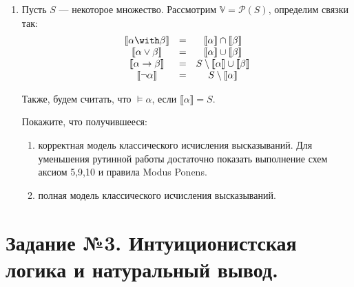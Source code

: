 \documentclass[10pt,a4paper,oneside]{article}
\begin{document}
\begin{enumerate}
\item Пусть $S$ --- некоторое множество. Рассмотрим $\mathbb{V} = \mathcal{P}(S)$, 
определим связки так:
$$\begin{array}{ccc}
  \llbracket\alpha \with \beta\rrbracket & = & \llbracket\alpha\rrbracket \cap \llbracket\beta\rrbracket \\
  \llbracket\alpha \vee \beta\rrbracket & = & \llbracket\alpha\rrbracket \cup \llbracket\beta\rrbracket \\
  \llbracket\alpha \rightarrow \beta\rrbracket & = & S\setminus\llbracket\alpha\rrbracket \cup \llbracket\beta\rrbracket \\
  \llbracket\neg\alpha\rrbracket & = & S\setminus\llbracket\alpha\rrbracket  \\
\end{array}$$

Также, будем считать, что $\models \alpha$, если $\llbracket\alpha\rrbracket = S$.

Покажите, что получившееся:
\begin{enumerate}
\item корректная модель классического исчисления высказываний.
Для уменьшения рутинной работы достаточно показать выполнение схем аксиом 5,9,10 и правила Modus Ponens.

\item полная модель классического исчисления высказываний.
\end{enumerate}

\end{enumerate}

\section*{Задание №3. Интуиционистская логика и натуральный вывод.}
\end{document}
